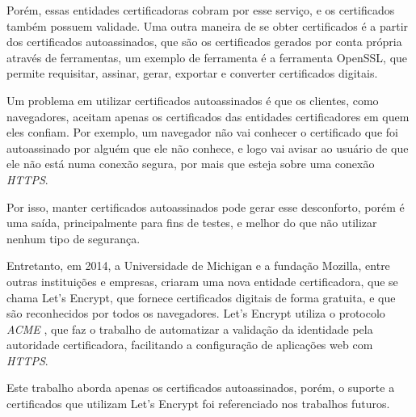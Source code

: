 Porém, essas entidades certificadoras cobram por esse serviço, e os certificados também
possuem validade. Uma outra maneira de se obter certificados é a partir dos certificados
autoassinados, que são os certificados gerados por conta própria através de
ferramentas, um exemplo de ferramenta é a ferramenta OpenSSL, que permite requisitar,
assinar, gerar, exportar e converter certificados digitais.

Um problema em utilizar certificados autoassinados é que os clientes, como navegadores,
aceitam apenas os certificados das entidades certificadores em quem eles confiam. Por
exemplo, um navegador não vai conhecer o certificado que foi autoassinado por
alguém que ele não conhece, e logo vai avisar ao usuário de que ele não está numa
conexão segura, por mais que esteja sobre uma conexão \textit{HTTPS}. 

Por isso, 
manter certificados
autoassinados pode gerar esse desconforto, porém é uma saída, principalmente para
fins de testes, e melhor do que não utilizar nenhum tipo de segurança.

Entretanto, em 2014, a Universidade de Michigan e a fundação Mozilla, entre outras 
instituições e empresas, criaram uma nova entidade certificadora, que se chama 
Let's Encrypt, que fornece certificados digitais de forma gratuita, e que são 
reconhecidos por todos os navegadores. Let's Encrypt utiliza o protocolo \textit{ACME} \cite{ACME}, que faz o trabalho de automatizar a validação da identidade pela autoridade 
certificadora, facilitando a configuração de aplicações web com \textit{HTTPS}. 

Este trabalho aborda apenas os certificados autoassinados, porém, o suporte
a certificados que utilizam Let's Encrypt foi referenciado nos trabalhos futuros.
